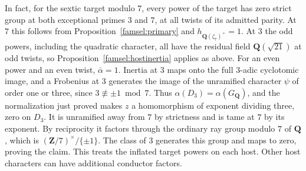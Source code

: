 In fact, for the sextic target modulo \(7\), every power of the
target has zero strict group at both exceptional primes \(3\) and
\(7\), at all twists of its admitted parity. At \(7\) this follows
from Proposition~\ref{famsel:primary} and \(h_{\mathbf Q(\zeta_7)^+}=1\).
At \(3\) the odd powers, including the quadratic character, all
have the residual field \(\mathbf Q(\sqrt{21})\) at odd twists, so
Proposition~\ref{famsel:hostinertia} applies as above. For an even
power and an even twist, \(\bar\alpha=1\). Inertia at \(3\) maps
onto the full \(3\)-adic cyclotomic image, and a Frobenius at \(3\)
generates the image of the unramified character \(\psi\) of order
one or three, since \(3\not\equiv\pm1\bmod7\). Thus
\(\alpha(D_3)=\alpha(G_{\mathbf Q})\), and the normalization just
proved makes \(z\) a homomorphism of exponent dividing three, zero
on \(D_3\). It is unramified away from \(7\) by strictness and
is tame at \(7\) by its exponent. By reciprocity it factors through
the ordinary ray group modulo \(7\) of \(\mathbf Q\), which is
\((\mathbf Z/7)^\times/\{\pm1\}\). The class of \(3\) generates
this group and maps to zero, proving the claim. This treats the
inflated target powers on each host. Other host characters can have
additional conductor factors.

